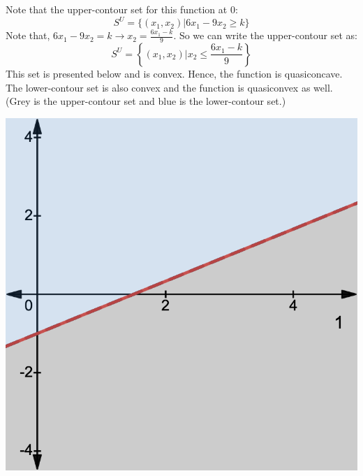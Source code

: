 \documentclass{./../../Latex/homework}
\begin{document}
\begin{enumerate}
\begin{enumerate}
  Note that the upper-contour set for this function at 0:
   $$  S^U = \{(x_1,x_2) | 6 x_{1}-9 x_{2} \geq k \} $$
   Note that, $6 x_{1}-9 x_{2} = k \rightarrow x_2 = \frac{6x_1-k}{9}$.
So we can write the upper-contour set as:
   $$  S^U = \left\{(x_1,x_2) | x_2 \leq \frac{6x_1-k}{9} \right\} $$
   This set is presented below and is convex. Hence, the function is quasiconcave. The lower-contour set is also convex and the function is quasiconvex as well. (Grey is the upper-contour set and blue is the lower-contour set.)
  \begin{center}
  	\includegraphics[scale=0.25]{3b.png}
  \end{center}
  

\end{enumerate}
\end{enumerate}
\end{document}
